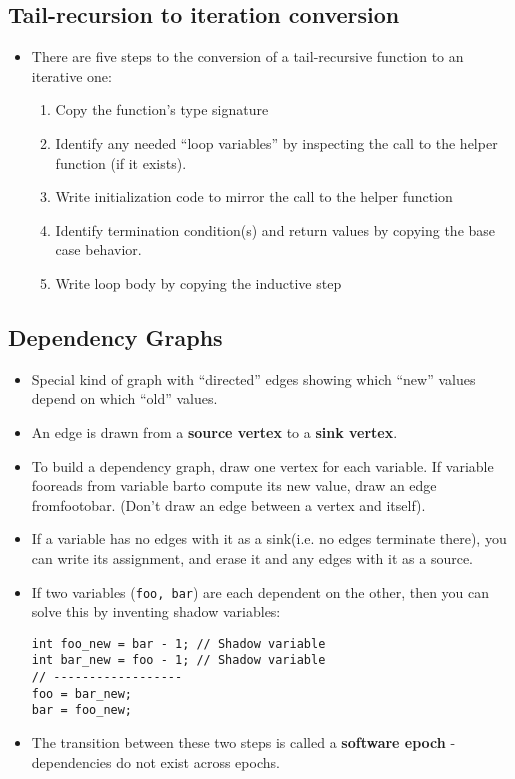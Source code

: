 \subsection{Tail-recursion to iteration conversion}
\begin{itemize}
	\item There are five steps to the conversion of a tail-recursive function to an iterative one:
	\begin{enumerate}
		\item Copy the function's type signature
		\item Identify any needed ``loop variables'' by inspecting the call to the helper function (if it exists).
		\item Write initialization code to mirror the call to the helper function
		\item Identify termination condition(s) and return values by copying the base case behavior.
		\item Write loop body by copying the inductive step
	\end{enumerate}
\end{itemize}

\subsection{Dependency Graphs}
\begin{itemize}
	\item Special kind of graph with ``directed'' edges showing which ``new'' values depend on which ``old'' values.
	\item An edge is drawn from a \textbf{source vertex} to a \textbf{sink vertex}.
	\item To build a dependency graph, draw one vertex for each variable. If variable fooreads from variable barto compute its new value, draw an edge fromfootobar. (Don't draw an edge between a vertex and itself).
	\item If a variable has no edges with it as a sink(i.e. no edges terminate there), you can write its assignment, and erase it and any edges with it as a source.
	\item If two variables (\lstinline[style=C++]{foo, bar}) are each dependent on the other, then you can solve this by inventing shadow variables:
\begin{lstlisting}[style=C++]
int foo_new = bar - 1; // Shadow variable
int bar_new = foo - 1; // Shadow variable
// ------------------
foo = bar_new;
bar = foo_new;
\end{lstlisting}
	\item The transition between these two steps is called a \textbf{software epoch} - dependencies do not exist across epochs.
\end{itemize}